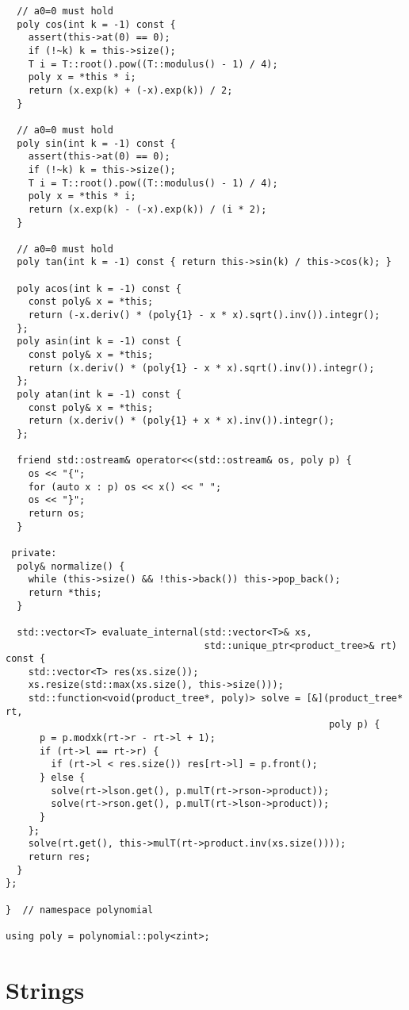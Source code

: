 \documentclass[6pt]{article}
\begin{document}
\begin{multicols}{2}
\begin{lstlisting}
  // a0=0 must hold
  poly cos(int k = -1) const {
    assert(this->at(0) == 0);
    if (!~k) k = this->size();
    T i = T::root().pow((T::modulus() - 1) / 4);
    poly x = *this * i;
    return (x.exp(k) + (-x).exp(k)) / 2;
  }

  // a0=0 must hold
  poly sin(int k = -1) const {
    assert(this->at(0) == 0);
    if (!~k) k = this->size();
    T i = T::root().pow((T::modulus() - 1) / 4);
    poly x = *this * i;
    return (x.exp(k) - (-x).exp(k)) / (i * 2);
  }

  // a0=0 must hold
  poly tan(int k = -1) const { return this->sin(k) / this->cos(k); }

  poly acos(int k = -1) const {
    const poly& x = *this;
    return (-x.deriv() * (poly{1} - x * x).sqrt().inv()).integr();
  };
  poly asin(int k = -1) const {
    const poly& x = *this;
    return (x.deriv() * (poly{1} - x * x).sqrt().inv()).integr();
  };
  poly atan(int k = -1) const {
    const poly& x = *this;
    return (x.deriv() * (poly{1} + x * x).inv()).integr();
  };

  friend std::ostream& operator<<(std::ostream& os, poly p) {
    os << "{";
    for (auto x : p) os << x() << " ";
    os << "}";
    return os;
  }

 private:
  poly& normalize() {
    while (this->size() && !this->back()) this->pop_back();
    return *this;
  }

  std::vector<T> evaluate_internal(std::vector<T>& xs,
                                   std::unique_ptr<product_tree>& rt) const {
    std::vector<T> res(xs.size());
    xs.resize(std::max(xs.size(), this->size()));
    std::function<void(product_tree*, poly)> solve = [&](product_tree* rt,
                                                         poly p) {
      p = p.modxk(rt->r - rt->l + 1);
      if (rt->l == rt->r) {
        if (rt->l < res.size()) res[rt->l] = p.front();
      } else {
        solve(rt->lson.get(), p.mulT(rt->rson->product));
        solve(rt->rson.get(), p.mulT(rt->lson->product));
      }
    };
    solve(rt.get(), this->mulT(rt->product.inv(xs.size())));
    return res;
  }
};

}  // namespace polynomial

using poly = polynomial::poly<zint>;
\end{lstlisting}

  \section{Strings}


\end{multicols}
\end{document}
